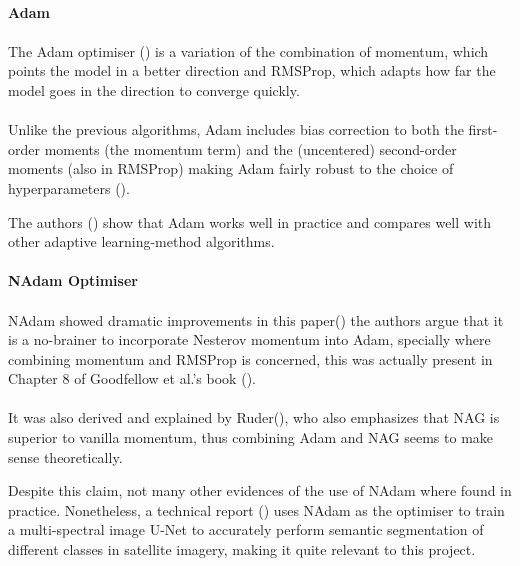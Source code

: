 \paragraph{\gls{Adam}}
\paragraph{}
The \gls{Adam} optimiser (\cite{kingma2017adam}) is a variation of the combination of momentum, which points the model in a better direction and RMSProp, which adapts how far the model goes in the direction to converge quickly.
\paragraph{}
Unlike the previous algorithms, \gls{Adam} includes bias correction to both the ﬁrst-order moments (the momentum term) and the (uncentered) second-order moments (also in RMSProp) making \gls{Adam} fairly robust to the choice of hyperparameters (\cite{GoodBengCour16}).

The authors (\cite{kingma2017adam}) show that \gls{Adam} works well in practice and compares well with other adaptive learning-method algorithms.

\paragraph{\gls{NAdam} Optimiser}
\paragraph{}
\gls{NAdam} showed dramatic improvements in this paper(\cite{nadam}) the authors argue that it is a no-brainer to incorporate Nesterov momentum into \gls{Adam}, specially where combining momentum and RMSProp is concerned, this was actually present in Chapter 8 of Goodfellow et al.'s book (\cite{GoodBengCour16}).

\paragraph{}
It was also derived and explained by Ruder(\cite{ruder2017overview}), who also emphasizes that \gls{NAG} is superior to vanilla momentum, thus combining \gls{Adam} and NAG seems to make sense theoretically. 

Despite this claim, not many other evidences of the use of \gls{NAdam} where found in practice. Nonetheless, a technical report (\cite{DBLP:journals/corr/IglovikovMO17}) uses \gls{NAdam} as the optimiser to train a  multi-spectral image U-Net to accurately perform semantic segmentation of different classes in satellite imagery, making it quite relevant to this project.

